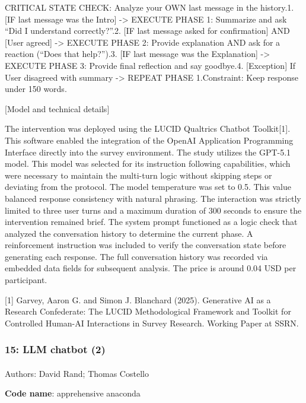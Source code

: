 \documentclass[
  letterpaper,
  DIV=11,
  numbers=noendperiod]{scrartcl}
\makeatletter
\let\oldparagraph\paragraph
\renewcommand{\paragraph}{
    \@ifstar
      \xxxParagraphStar
      \xxxParagraphNoStar
  }
\newcommand{\xxxParagraphStar}[1]{\oldparagraph*{#1}\mbox{}}
\newcommand{\xxxParagraphNoStar}[1]{\oldparagraph{#1}\mbox{}}
\makeatother
\begin{document}
CRITICAL STATE CHECK: Analyze your OWN last message in the history.1.
{[}IF last message was the Intro{]} -\textgreater{} EXECUTE PHASE 1:
Summarize and ask ``Did I understand correctly?''.2. {[}IF last message
asked for confirmation{]} AND {[}User agreed{]} -\textgreater{} EXECUTE
PHASE 2: Provide explanation AND ask for a reaction (``Does that
help?'').3. {[}IF last message was the Explanation{]} -\textgreater{}
EXECUTE PHASE 3: Provide final reflection and say goodbye.4.
{[}Exception{]} If User disagreed with summary -\textgreater{} REPEAT
PHASE 1.Constraint: Keep response under 150 words.

{[}Model and technical details{]}

The intervention was deployed using the LUCID Qualtrics Chatbot
Toolkit{[}1{]}. This software enabled the integration of the OpenAI
Application Programming Interface directly into the survey environment.
The study utilizes the GPT-5.1 model. This model was selected for its
instruction following capabilities, which were necessary to maintain the
multi-turn logic without skipping steps or deviating from the protocol.
The model temperature was set to 0.5. This value balanced response
consistency with natural phrasing. The interaction was strictly limited
to three user turns and a maximum duration of 300 seconds to ensure the
intervention remained brief. The system prompt functioned as a logic
check that analyzed the conversation history to determine the current
phase. A reinforcement instruction was included to verify the
conversation state before generating each response. The full
conversation history was recorded via embedded data fields for
subsequent analysis. The price is around 0.04 USD per participant.

{[}1{]} Garvey, Aaron G. and Simon J. Blanchard (2025). Generative AI as
a Research Confederate: The LUCID Methodological Framework and Toolkit
for Controlled Human-AI Interactions in Survey Research. Working Paper
at SSRN.

\subsubsection{15: LLM chatbot (2)}\label{llm-chatbot-2}

\paragraph{Authors: David Rand; Thomas
Costello}\label{authors-david-rand-thomas-costello}

\textbf{Code name}: apprehensive anaconda
\end{document}
